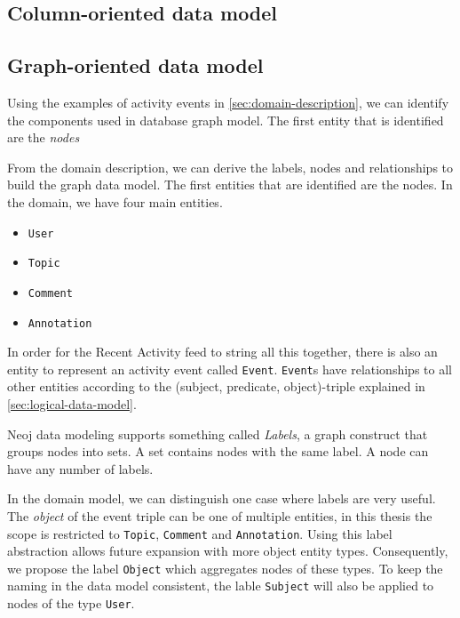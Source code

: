 \subsection{Column-oriented data model}
\label{subsec:column-data-model}

\subsection{Graph-oriented data model}
\label{subsec:graph-data-model}

Using the examples of activity events in \cref{sec:domain-description}, we can identify the components used in database graph model.
The first entity that is identified are the \textit{nodes}








From the domain description, we can derive the labels, nodes and relationships to build the graph data model.
The first entities that are identified are the nodes.
In the domain, we have four main entities.

\begin{itemize}
  \item \texttt{User}
  \item \texttt{Topic}
  \item \texttt{Comment}
  \item \texttt{Annotation}
\end{itemize}

In order for the Recent Activity feed to string all this together, there is also an entity to represent an activity event called \texttt{Event}.
\texttt{Event}s have relationships to all other entities according to the (subject, predicate, object)-triple explained in \cref{sec:logical-data-model}.

Neoj data modeling supports something called \textit{Labels}, a graph construct that groups nodes into sets.
A set contains nodes with the same label.
A node can have any number of labels.

In the domain model, we can distinguish one case where labels are very useful.
The \textit{object} of the event triple can be one of multiple entities, in this thesis the scope is restricted to \texttt{Topic}, \texttt{Comment} and \texttt{Annotation}.
Using this label abstraction allows future expansion with more object entity types.
Consequently, we propose the label \texttt{Object} which aggregates nodes of these types.
To keep the naming in the data model consistent, the lable \texttt{Subject} will also be applied to nodes of the type \texttt{User}.

